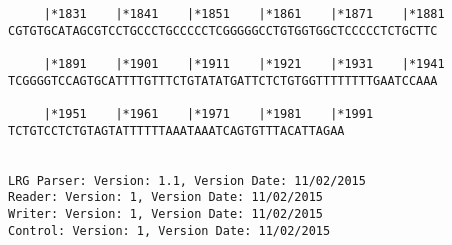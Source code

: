 \documentclass{article}
\begin{document}
\begin{Verbatim}
     |*1831    |*1841    |*1851    |*1861    |*1871    |*1881
CGTGTGCATAGCGTCCTGCCCTGCCCCCTCGGGGGCCTGTGGTGGCTCCCCCTCTGCTTC
                                                            
     |*1891    |*1901    |*1911    |*1921    |*1931    |*1941
TCGGGGTCCAGTGCATTTTGTTTCTGTATATGATTCTCTGTGGTTTTTTTTGAATCCAAA
                                                            
     |*1951    |*1961    |*1971    |*1981    |*1991
TCTGTCCTCTGTAGTATTTTTTAAATAAATCAGTGTTTACATTAGAA

                                               
LRG Parser: Version: 1.1, Version Date: 11/02/2015
Reader: Version: 1, Version Date: 11/02/2015
Writer: Version: 1, Version Date: 11/02/2015
Control: Version: 1, Version Date: 11/02/2015
\end{Verbatim}
\end{document}
